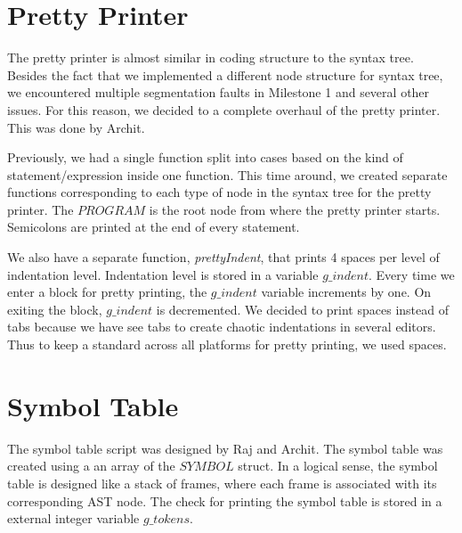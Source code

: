 \documentclass[preprint,12pt]{elsarticle}
\begin{document}
\section{Pretty Printer}

The pretty printer is almost similar in coding structure to the syntax tree. Besides the fact that we implemented a different node structure for syntax tree,  we encountered multiple segmentation faults in Milestone 1 and several other issues. For this reason, we decided to a complete overhaul of the pretty printer. This was done by Archit. 

Previously, we had a single function split into cases based on the kind of statement/expression inside one function. This time around, we created separate functions corresponding to each type of node in the syntax tree for the pretty printer. The $PROGRAM$ is the root node from where the pretty printer starts. Semicolons are printed at the end of every statement.

We also have a separate function, \textit{prettyIndent}, that prints 4 spaces per level of indentation level. Indentation level is stored in a variable $g\_indent$. Every time we enter a block for pretty printing, the $g\_indent$ variable increments by one. On exiting the block, $g\_indent$ is decremented. We decided to print spaces instead of tabs because we have see tabs to create chaotic indentations in several editors. Thus to keep a standard across all platforms for pretty printing, we used spaces.


\section{Symbol Table}

The symbol table script was designed by Raj and Archit. The symbol table was created using a an array of the $SYMBOL$ struct. In a logical sense, the symbol table is designed like a stack of frames, where each frame is associated with its corresponding AST node. The check for printing the symbol table is stored in a external integer variable $g\_tokens$. 
\end{document}
